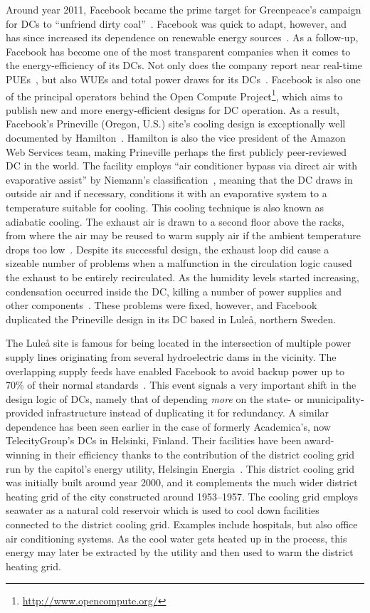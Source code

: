\documentclass[officiallayout]{tktla}
\begin{document}
Around year 2011, Facebook became the prime target for Greenpeace's campaign
for DCs to ``unfriend dirty coal''~\cite{VanHorn2011}. Facebook was quick to
adapt, however, and has since increased its dependence on renewable energy
sources~\cite{Meikle2011}. As a follow-up, Facebook has become one of the most
transparent companies when it comes to the energy-efficiency of its DCs.  Not
only does the company report near real-time PUEs~\cite{McTiernan2013}, but
also WUEs and total power draws for its DCs~\cite{Facebook2013}. Facebook is
also one of the principal operators behind the Open Compute
Project\footnote{\url{http://www.opencompute.org/}}, which aims to publish new
and more energy-efficient designs for DC operation. As a result, Facebook's
Prineville (Oregon, U.S.) site's cooling design is exceptionally well
documented by Hamilton~\cite{Hamilton2011}. Hamilton is also the vice
president of the Amazon Web Services team, making Prineville perhaps the first
publicly peer-reviewed DC in the world. The facility employs ``air conditioner
bypass via direct air with evaporative assist'' by Niemann's
classification~\cite{Niemann2010}, meaning that the DC draws in outside air
and if necessary, conditions it with an evaporative system to a temperature
suitable for cooling. This cooling technique is also known as adiabatic
cooling. The exhaust air is drawn to a second floor above the racks, from
where the air may be reused to warm supply air if the ambient temperature
drops too low~\cite{Hamilton2011}. Despite its successful design, the exhaust
loop did cause a sizeable number of problems when a malfunction in the
circulation logic caused the exhaust to be entirely recirculated. As the
humidity levels started increasing, condensation occurred inside the DC,
killing a number of power supplies and other components~\cite{Mulay2011}.
These problems were fixed, however, and Facebook duplicated the Prineville
design in its DC based in Luleå, northern Sweden.

The Luleå site is famous for being located in the intersection of multiple
power supply lines originating from several hydroelectric dams in the
vicinity. The overlapping supply feeds have enabled Facebook to avoid backup
power up to 70\% of their normal standards~\cite{Miller2011,Miller2013}. This
event signals a very important shift in the design logic of DCs, namely that
of depending \emph{more} on the state- or municipality-provided infrastructure
instead of duplicating it for redundancy. A similar dependence has been seen
earlier in the case of formerly Academica's, now TelecityGroup's DCs in
Helsinki, Finland. Their facilities have been award-winning in their
efficiency thanks to the contribution of the district cooling grid run by the
capitol's energy utility, Helsingin Energia~\cite{Uptime2010}. This district
cooling grid was initially built around year 2000, and it complements the much
wider district heating grid of the city constructed around 1953--1957. The
cooling grid employs seawater as a natural cold reservoir which is used to
cool down facilities connected to the district cooling grid.  Examples include
hospitals, but also office air conditioning systems. As the cool water gets
heated up in the process, this energy may later be extracted by the utility
and then used to warm the district heating grid.
\end{document}
